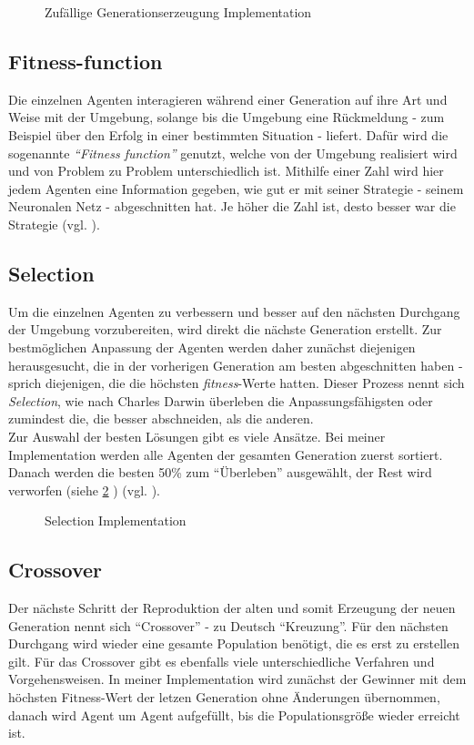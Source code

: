 \documentclass[parskip=half,titlepage]{scrartcl}
\begin{document}
\begin{figure}[h]
 
 \caption{Zufällige Generationserzeugung Implementation}
 \label{fig:gen_random}
\end{figure}

\subsection{Fitness-function}
Die einzelnen Agenten interagieren während einer Generation auf ihre Art und Weise mit der Umgebung, solange bis die Umgebung eine Rückmeldung - zum Beispiel über den Erfolg in einer bestimmten Situation - liefert. Dafür wird die sogenannte \textit{``Fitness function''} genutzt, welche von der Umgebung realisiert wird und von Problem zu Problem unterschiedlich ist. Mithilfe einer Zahl wird hier jedem Agenten eine Information gegeben, wie gut er mit seiner Strategie - seinem Neuronalen Netz - abgeschnitten hat. Je höher die Zahl ist, desto besser war die Strategie (vgl. \cite[30]{eiben_smith_2016} ).


\subsection{Selection}
Um die einzelnen Agenten zu verbessern und besser auf den nächsten Durchgang der Umgebung vorzubereiten, wird direkt die nächste Generation erstellt. Zur bestmöglichen Anpassung der Agenten werden daher zunächst diejenigen herausgesucht, die in der vorherigen Generation am besten abgeschnitten haben - sprich diejenigen, die die höchsten \textit{fitness}-Werte hatten. Dieser Prozess nennt sich \textit{Selection}, wie nach Charles Darwin überleben die Anpassungsfähigsten oder zumindest die, die besser abschneiden, als die anderen. \\
Zur Auswahl der besten Lösungen gibt es viele Ansätze. Bei meiner Implementation werden alle Agenten der gesamten Generation zuerst sortiert. Danach werden die besten 50\% zum ``Überleben'' ausgewählt, der Rest wird verworfen (siehe \cref{fig:selection} ) (vgl. \cite[31 - 33]{eiben_smith_2016} ).

\begin{figure}[h]
 
 \caption{Selection Implementation}
 \label{fig:selection}
\end{figure}


\subsection{Crossover}
\label{subsec:crossover}
Der nächste Schritt der Reproduktion der alten und somit Erzeugung der neuen Generation nennt sich ``Crossover'' - zu Deutsch ``Kreuzung''. Für den nächsten Durchgang wird wieder eine gesamte Population benötigt, die es erst zu erstellen gilt. Für das Crossover gibt es ebenfalls viele unterschiedliche Verfahren und Vorgehensweisen. In meiner Implementation wird zunächst der Gewinner mit dem höchsten Fitness-Wert der letzen Generation ohne Änderungen übernommen, danach wird Agent um Agent aufgefüllt, bis die Populationsgröße wieder erreicht ist. 
\end{document}
